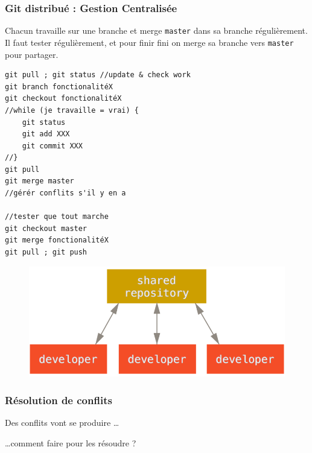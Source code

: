 \documentclass[table,tikz,12pt,svgnames]{beamer}
\begin{document}
\begin{frame}[fragile]
\frametitle{Git distribué : Gestion Centralisée}
\begin{adjustwidth}{-1em}{0cm}{}
\vspace{-2.3em}
\color{darkgreen}%
Chacun travaille sur une branche et merge \texttt{master} dans sa branche régulièrement. Il faut tester régulièrement, et pour finir fini on merge sa branche vers \texttt{master} pour partager.\\
\color{black}
\vspace{-1em}
\begin{verbatim}
git pull ; git status //update & check work
git branch fonctionalitéX
git checkout fonctionalitéX
//while (je travaille = vrai) {
	git status
	git add XXX
	git commit XXX
//}
git pull
git merge master
//gérér conflits s'il y en a

//tester que tout marche
git checkout master
git merge fonctionalitéX
git pull ; git push
\end{verbatim}
\end{adjustwidth}

\vspace{-12em}

\begin{adjustwidth}{-0cm}{-1cm}{}
	\begin{figure}
		\hfill
		\includegraphics[scale=0.22]{images/centralized_workflow.png}
	\end{figure}
\end{adjustwidth}


\end{frame}

\begin{frame}
\frametitle{Résolution de conflits}
\begin{block}{Des conflits vont se produire \ldots}
\end{block}
\begin{block}{\ldots comment faire pour les résoudre ?}
\end{block}
\end{frame}
\end{document}
